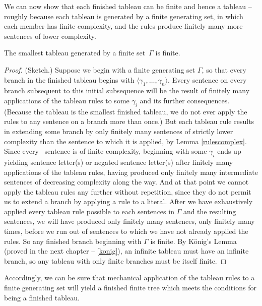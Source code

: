 We can now show that each finished tableau can be finite and hence a tableau – roughly because each tableau is generated by a finite generating set, in which each member has finite complexity, and the rules produce finitely many more sentences of lower complexity. 
\begin{theorem}\label{fintab}
	The smallest tableau generated by a finite set\, $\Gamma$ is finite. \begin{proof} (Sketch.)
		Suppose we begin with a finite generating set $\Gamma$, so that every branch in the finished tableau begins with $\langle \gamma_{1},…,\gamma_{n}\rangle$. Every sentence on every branch subsequent to this initial subsequence will be the result of finitely many applications of the tableau rules to some $\gamma_{i}$ and its further consequences. (Because the tableau is the smallest finished tableau, we do not ever apply the rules to any sentence on a branch more than once.)  But each tableau rule results in extending some branch by only finitely many sentences of strictly lower complexity than the sentence to which it is applied, by Lemma \ref{rulescomplex}. Since every \lone\ sentence is of finite complexity, beginning with some $\gamma_{i}$ ends up yielding sentence letter(s) or negated sentence letter(s) after finitely many applications of the tableau rules, having produced only finitely many intermediate sentences of decreasing complexity along the way. And at that point we cannot apply the tableau rules any further without repetition, since they do not permit us to extend a branch by applying a rule to a literal. After we have exhaustively applied every tableau rule possible to each sentences in $\Gamma$ and the resulting sentences, we will have produced only finitely many sentences, only finitely many times, before we run out of sentences to which we have not already applied the rules. So any finished branch beginning with $\Gamma$ is finite. By König's Lemma (proved in the next chapter – \autoref{konig}), an infinite tableau must have an infinite branch, so any tableau with only finite branches must be itself finite. 
	\end{proof}
\end{theorem}
Accordingly, we can be sure that mechanical application of the tableau rules to a finite generating set will yield a finished finite tree which meets the conditions for being a finished tableau.

